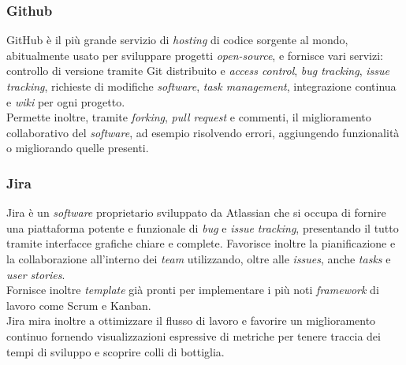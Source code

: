 \subsubsection{Github}
GitHub è il più grande servizio di \textit{hosting} di codice sorgente al mondo, abitualmente usato per sviluppare progetti \textit{open-source}, e fornisce vari servizi: controllo di versione tramite Git distribuito e \textit{access control}, \textit{bug tracking}, \textit{issue tracking}, richieste di modifiche \textit{software}, \textit{task management}, integrazione continua e \textit{wiki} per ogni progetto.\\ 
Permette inoltre, tramite \textit{forking}, \textit{pull request} e commenti, il miglioramento collaborativo del \textit{software}, ad esempio risolvendo errori, aggiungendo funzionalità o migliorando quelle presenti.

\subsubsection{Jira}
Jira è un \textit{software} proprietario sviluppato da Atlassian che si occupa di fornire una piattaforma potente e funzionale di \textit{bug} e \textit{issue tracking}, presentando il tutto tramite interfacce grafiche chiare e complete. Favorisce inoltre la pianificazione e la collaborazione all'interno dei \textit{team} utilizzando, oltre alle \textit{issues}, anche \textit{tasks} e \textit{user stories}.\\
Fornisce inoltre \textit{template} già pronti per implementare i più noti \textit{framework} di lavoro come Scrum e Kanban.\\
Jira mira inoltre a ottimizzare il flusso di lavoro e favorire un miglioramento continuo fornendo visualizzazioni espressive di metriche per tenere traccia dei tempi di sviluppo e scoprire colli di bottiglia.

